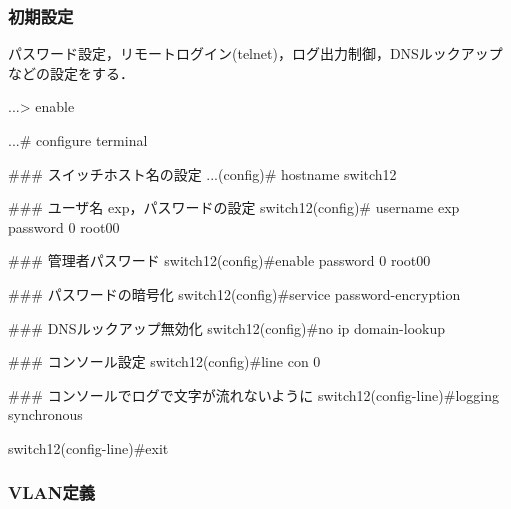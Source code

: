 \subsubsection{初期設定}

パスワード設定，リモートログイン(telnet)，ログ出力制御，DNSルックアップなどの設定をする．

\begin{cli}
...> enable

...# configure terminal

### スイッチホスト名の設定
...(config)# hostname switch12

### ユーザ名 exp，パスワードの設定
switch12(config)# username exp password 0 root00

### 管理者パスワード
switch12(config)#enable password 0 root00

### パスワードの暗号化
switch12(config)#service password-encryption

### DNSルックアップ無効化
switch12(config)#no ip domain-lookup

### コンソール設定
switch12(config)#line con 0

### コンソールでログで文字が流れないように
switch12(config-line)#logging synchronous

switch12(config-line)#exit

\end{cli}

\subsubsection{VLAN定義}

